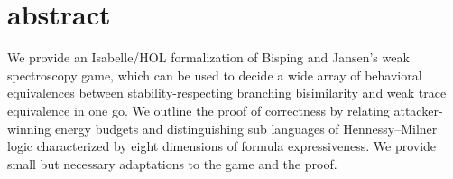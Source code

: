 \section{abstract}

We provide an Isabelle/HOL formalization of Bisping and Jansen's weak spectroscopy game, which can be used to decide a wide
array of behavioral equivalences between stability-respecting branching bisimilarity and weak trace equivalence in one go. 
We outline the proof of correctness by relating attacker-winning energy budgets and distinguishing sub 
languages of Hennessy–Milner logic characterized by eight dimensions of formula expressiveness. 
We provide small but necessary adaptations to the game and the proof.
